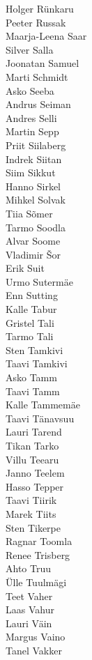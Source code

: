 \begin{multicols}{3}
Holger Rünkaru\\
Peeter Russak\\
Maarja-Leena Saar\\
Silver Salla\\
Joonatan Samuel\\
Marti Schmidt\\
Asko Seeba\\
Andrus Seiman\\
Andres Selli\\
Martin Sepp\\
Priit Siilaberg\\
Indrek Siitan\\
Siim Sikkut\\
Hanno Sirkel\\
Mihkel Solvak\\
Tiia Sõmer\\
Tarmo Soodla\\
Alvar Soome\\
Vladimir Šor\\
Erik Suit\\
Urmo Sutermäe\\
Enn Sutting\\
Kalle Tabur\\
Gristel Tali\\
Tarmo Tali\\
Sten Tamkivi\\
Taavi Tamkivi\\
Asko Tamm\\
Taavi Tamm\\
Kalle Tammemäe\\
Taavi Tänavsuu\\
Lauri Tarend\\
Tikan Tarko\\
Villu Teearu\\
Janno Teelem\\
Hasso Tepper\\
Taavi Tiirik\\
Marek Tiits\\
Sten Tikerpe\\
Ragnar Toomla\\
Renee Trisberg\\
Ahto Truu\\
Ülle Tuulmägi\\
Teet Vaher\\
Laas Vahur\\
Lauri Väin\\
Margus Vaino\\
Tanel Vakker\\

\end{multicols}
